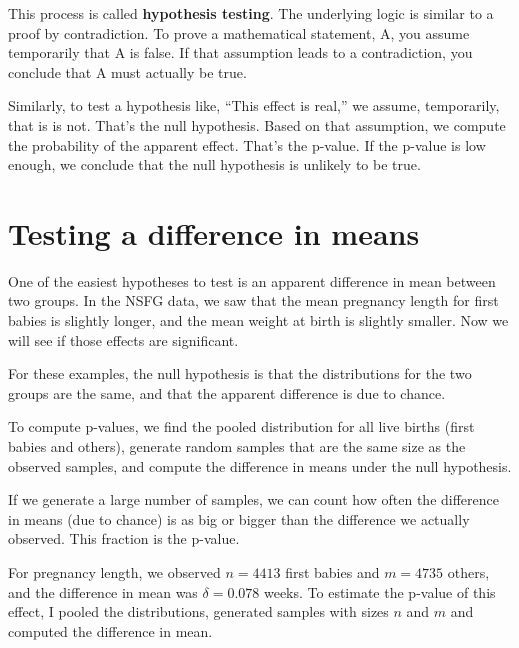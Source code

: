 \documentclass[12pt]{book}
\begin{document}
This process is called {\bf hypothesis testing}.  The underlying
logic is similar to a proof by contradiction.  To prove a mathematical
statement, A, you assume temporarily that A is false.  If that
assumption leads to a contradiction, you conclude that A must actually
be true.


Similarly, to test a hypothesis like, ``This effect is real,'' we
assume, temporarily, that is is not.  That's the null hypothesis.
Based on that assumption, we compute the probability of the apparent
effect.  That's the p-value.  If the p-value is low enough, we
conclude that the null hypothesis is unlikely to be true.


\section{Testing a difference in means}

One of the easiest hypotheses to test is an apparent difference in mean
between two groups.  In the NSFG data, we saw that the mean pregnancy
length for first babies is slightly longer, and the mean weight at
birth is slightly smaller.  Now we will see if those effects are
significant.


For these examples, the null hypothesis is that the distributions
for the two groups are the same, and that the apparent difference is
due to chance.


To compute p-values, we find the pooled distribution for all live
births (first babies and others), generate random samples that are
the same size as the observed samples, and compute the difference
in means under the null hypothesis.


If we generate a large number of samples, we can count how often the
difference in means (due to chance) is as big or bigger than the
difference we actually observed.  This fraction is the p-value.

For pregnancy length, we observed $n=4413$ first babies and $m=4735$
others, and the difference in mean was $\delta=0.078$ weeks.  To estimate
the p-value of this effect, I pooled the distributions, generated
samples with sizes $n$ and $m$ and computed the difference in mean.
\end{document}
